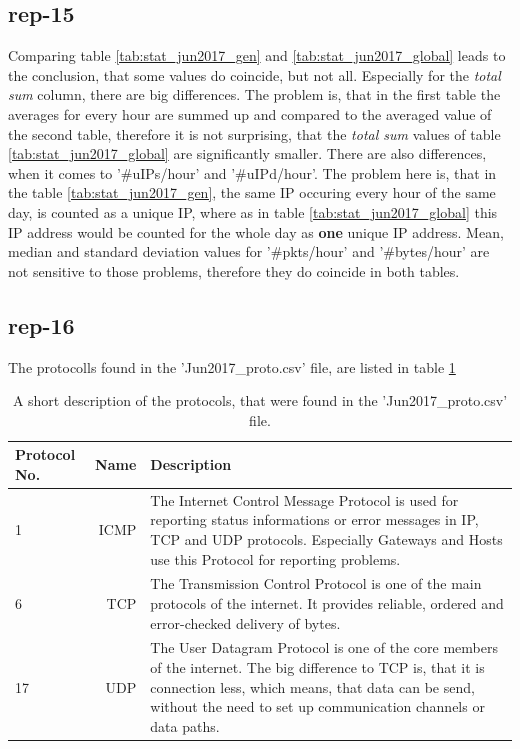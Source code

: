 \subsection*{rep-15}
Comparing table \ref{tab:stat_jun2017_gen} and \ref{tab:stat_jun2017_global} leads to the conclusion, that some values do coincide, but not all. Especially for the \textit{total sum} column, there are big differences. The problem is, that in the first table the averages for every hour are summed up and compared to the averaged value of the second table, therefore it is not surprising, that the \textit{total sum} values of table \ref{tab:stat_jun2017_global} are significantly smaller.
There are also differences, when it comes to '\#uIPs/hour' and '\#uIPd/hour'. The problem here is, that in the table \ref{tab:stat_jun2017_gen}, the same IP occuring every hour of the same day, is counted as a unique IP, where as in table \ref{tab:stat_jun2017_global} this IP address would be counted for the whole day as \textbf{one} unique IP address.
Mean, median and standard deviation values for '\#pkts/hour' and '\#bytes/hour' are not sensitive to those problems, therefore they do coincide in both tables.

\subsection*{rep-16}
The protocolls found in the 'Jun2017\_proto.csv' file, are listed in table \ref{tab:proto}

\begin{table}[H]
\center
\begin{tabular}{lrp{5cm}}
\toprule
Protocol No. & Name & Description \\
\midrule
1 & ICMP & The Internet Control Message Protocol is used for reporting status informations or error messages in IP, TCP and UDP protocols. Especially Gateways and Hosts use this Protocol for reporting problems.\\
6 & TCP & The Transmission Control Protocol is one of the main protocols of the internet. It provides reliable, ordered and error-checked delivery of bytes. \\
17 & UDP & The User Datagram Protocol is one of the core members of the internet. The big difference to TCP is, that it is connection less, which means, that data can be send, without the need to set up communication channels or data paths.\\
\bottomrule
\end{tabular}
\caption{A short description of the protocols, that were found in the 'Jun2017\_proto.csv' file.}
\label{tab:proto}
\end{table}

